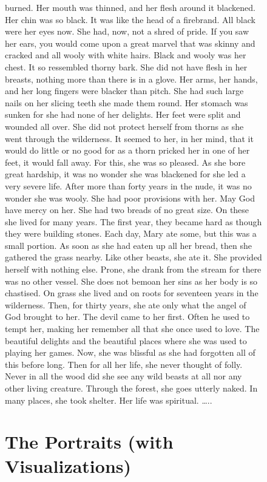 \documentclass[
  letterpaper,
  DIV=11,
  numbers=noendperiod,
  oneside]{scrreprt}
\begin{document}
\begin{figure}
burned. Her mouth was thinned, and her flesh around it blackened. Her
chin was so black. It was like the head of a firebrand. All black were
her eyes now. She had, now, not a shred of pride. If you saw her ears,
you would come upon a great marvel that was skinny and cracked and all
wooly with white hairs. Black and wooly was her chest. It so ressembled
thorny bark. She did not have flesh in her breasts, nothing more than
there is in a glove. Her arms, her hands, and her long fingers were
blacker than pitch. She had such large nails on her slicing teeth she
made them round. Her stomach was sunken for she had none of her
delights. Her feet were split and wounded all over. She did not protect
herself from thorns as she went through the wilderness. It seemed to
her, in her mind, that it would do little or no good for as a thorn
pricked her in one of her feet, it would fall away. For this, she was so
pleased. As she bore great hardship, it was no wonder she was blackened
for she led a very severe life. After more than forty years in the nude,
it was no wonder she was wooly. She had poor provisions with her. May
God have mercy on her. She had two breads of no great size. On these she
lived for many years. The first year, they became hard as though they
were building stones. Each day, Mary ate some, but this was a small
portion. As soon as she had eaten up all her bread, then she gathered
the grass nearby. Like other beasts, she ate it. She provided herself
with nothing else. Prone, she drank from the stream for there was no
other vessel. She does not bemoan her sins as her body is so chastised.
On grass she lived and on roots for seventeen years in the wilderness.
Then, for thirty years, she ate only what the angel of God brought to
her. The devil came to her first. Often he used to tempt her, making her
remember all that she once used to love. The beautiful delights and the
beautiful places where she was used to playing her games. Now, she was
blissful as she had forgotten all of this before long. Then for all her
life, she never thought of folly. Never in all the wood did she see any
wild beasts at all nor any other living creature. Through the forest,
she goes utterly naked. In many places, she took shelter. Her life was
spiritual. \ldots..


\chapter{The Portraits (with
Visualizations)}\label{the-portraits-with-visualizations}


\end{figure}
\end{document}
